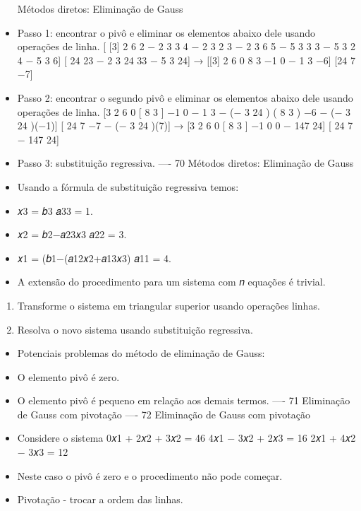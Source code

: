 \documentclass[
]{article}
\providecommand{\tightlist}{%
  \setlength{\itemsep}{0pt}\setlength{\parskip}{0pt}}
\begin{document}
\begin{itemize}
  Métodos diretos: Eliminação de Gauss
\item
  Passo 1: encontrar o pivô e eliminar os elementos abaixo dele usando
  operações de linha. {[} {[}3{]} 2 6 2 − 2 3 3 4 − 2 3 2 3 − 2 3 6 5 −
  5 3 3 3 − 5 3 2 4 − 5 3 6{]} {[} 24 23 − 2 3 24 33 − 5 3 24{]} →
  {[}{[}3{]} 2 6 0 8 3 −1 0 − 1 3 −6{]} {[}24 7 −7{]}
\item
  Passo 2: encontrar o segundo pivô e eliminar os elementos abaixo dele
  usando operações de linha. {[}3 2 6 0 {[} 8 3 {]} −1 0 − 1 3 − (− 3 24
  ) ( 8 3 ) −6 − (− 3 24 )(−1){]} {[} 24 7 −7 − (− 3 24 )(7){]} → {[}3 2
  6 0 {[} 8 3 {]} −1 0 0 − 147 24{]} {[} 24 7 − 147 24{]}
\item
  Passo 3: substituição regressiva. ---- 70 Métodos diretos: Eliminação
  de Gauss
\item
  Usando a fórmula de substituição regressiva temos:
\item
  𝑥3 = 𝑏3 𝑎33 = 1.
\item
  𝑥2 = 𝑏2−𝑎23𝑥3 𝑎22 = 3.
\item
  𝑥1 = (𝑏1−(𝑎12𝑥2+𝑎13𝑥3) 𝑎11 = 4.
\item
  A extensão do procedimento para um sistema com 𝑛 equações é trivial.
\end{itemize}

\begin{enumerate}
\def\labelenumi{\arabic{enumi}.}
\tightlist
\item
  Transforme o sistema em triangular superior usando operações linhas.
\item
  Resolva o novo sistema usando substituição regressiva.
\end{enumerate}

\begin{itemize}
\tightlist
\item
  Potenciais problemas do método de eliminação de Gauss:
\item
  O elemento pivô é zero.
\item
  O elemento pivô é pequeno em relação aos demais termos. ---- 71
  Eliminação de Gauss com pivotação ---- 72 Eliminação de Gauss com
  pivotação
\item
  Considere o sistema 0𝑥1 + 2𝑥2 + 3𝑥2 = 46 4𝑥1 − 3𝑥2 + 2𝑥3 = 16 2𝑥1 +
  4𝑥2 − 3𝑥3 = 12
\item
  Neste caso o pivô é zero e o procedimento não pode começar.
\item
  Pivotação - trocar a ordem das linhas.
\end{itemize}
\end{document}
